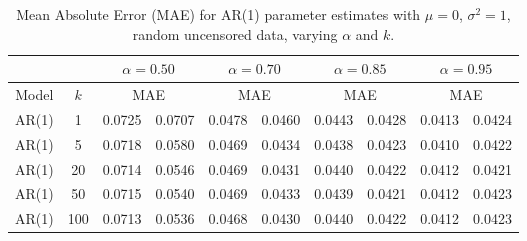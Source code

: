 \documentclass[10pt,twoside]{article}
\numberwithin{equation}{section}
\begin{document}
\begin{table}[htbp]

\begin{center}

\small

\caption{Mean Absolute Error (MAE) for AR(1) parameter estimates with $\mu=0$, $\sigma^2=1$, random uncensored data, varying $\alpha$ and $k$.}

\label{tab:MAE}

\begin{tabular}{|c|c|c|c|c|c|c|c|c|c|}

\hline

\multicolumn{2}{|c|}{} & \multicolumn{2}{|c|}{$\alpha=0.50$} & \multicolumn{2}{|c|}{$\alpha=0.70$} & \multicolumn{2}{|c|}{$\alpha=0.85$} & \multicolumn{2}{|c|}{$\alpha=0.95$} \\ \hline

Model & $k$ & \multicolumn{2}{|c|}{MAE} & \multicolumn{2}{|c|}{MAE} & \multicolumn{2}{|c|}{MAE} & \multicolumn{2}{|c|}{MAE} \\ \hline

AR(1) & 1 & 0.0725 & 0.0707 & 0.0478 & 0.0460 & 0.0443 & 0.0428 & 0.0413 & 0.0424 \\

AR(1) & 5 & 0.0718 & 0.0580 & 0.0469 & 0.0434 & 0.0438 & 0.0423 & 0.0410 & 0.0422 \\

AR(1) & 20 & 0.0714 & 0.0546 & 0.0469 & 0.0431 & 0.0440 & 0.0422 & 0.0412 & 0.0421 \\

AR(1) & 50 & 0.0715 & 0.0540 & 0.0469 & 0.0433 & 0.0439 & 0.0421 & 0.0412 & 0.0423 \\

AR(1) & 100 & 0.0713 & 0.0536 & 0.0468 & 0.0430 & 0.0440 & 0.0422 & 0.0412 & 0.0423 \\ \hline

\end{tabular}

\end{center}

\end{table}
\end{document}
